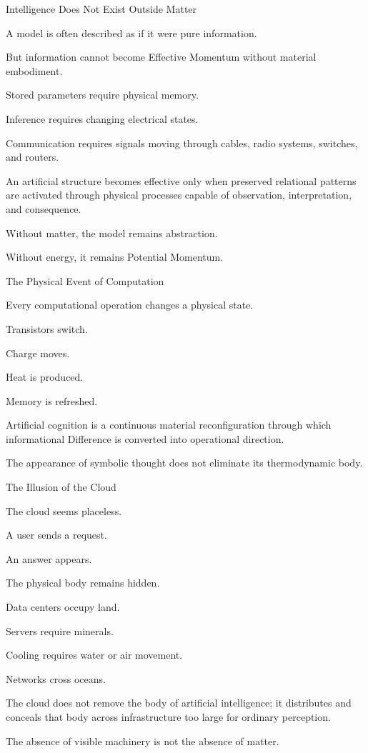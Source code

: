 Intelligence Does Not Exist Outside Matter

A model is often described as if it were pure information.

But information cannot become Effective Momentum without material embodiment.

Stored parameters require physical memory.

Inference requires changing electrical states.

Communication requires signals moving through cables, radio systems, switches, and routers.

An artificial structure becomes effective only when preserved relational patterns are activated through physical processes capable of observation, interpretation, and consequence.

Without matter, the model remains abstraction.

Without energy, it remains Potential Momentum.

The Physical Event of Computation

Every computational operation changes a physical state.

Transistors switch.

Charge moves.

Heat is produced.

Memory is refreshed.

Artificial cognition is a continuous material reconfiguration through which informational Difference is converted into operational direction.

The appearance of symbolic thought does not eliminate its thermodynamic body.

The Illusion of the Cloud

The cloud seems placeless.

A user sends a request.

An answer appears.

The physical body remains hidden.

Data centers occupy land.

Servers require minerals.

Cooling requires water or air movement.

Networks cross oceans.

The cloud does not remove the body of artificial intelligence; it distributes and conceals that body across infrastructure too large for ordinary perception.

The absence of visible machinery is not the absence of matter.


